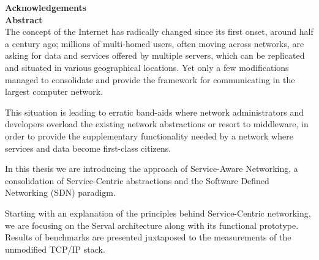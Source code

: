 \documentclass[12pt,a4paper,oneside]{article}
\begin{document}
\newcommand{\chapterpage}[2]{
	\newpage
	\pagestyle{empty}
	\phantomsection
	\addcontentsline{toc}{part}{#1}
	{\Huge \bf \noindent #2}
	\newpage
}

\newpage
\pagestyle{empty}
\mbox{}

\newpage
\setcounter{page}{2}


\newpage
\pagestyle{plain}
{\Large \bf \noindent Acknowledgements} \\[0.5cm]


\newpage
\thispagestyle{empty}
{\Large \bf \noindent Abstract} \\[0.13cm]

\noindent The concept of the Internet has radically changed since its first onset, around half a century ago; millions of multi-homed users, often moving across networks, are asking for data and services offered by multiple servers, which can be replicated and situated in various geographical locations.
Yet only a few modifications managed to consolidate and provide the framework for communicating in the largest computer network.

This situation is leading to erratic band-aids where network administrators and developers overload the existing network abstractions or resort to middleware, in order to provide the supplementary functionality needed by a network where services and data become first-class citizens.

In this thesis we are introducing the approach of Service-Aware Networking, a consolidation of Service-Centric abstractions and the Software Defined Networking (SDN) paradigm.

Starting with an explanation of the principles behind Service-Centric networking, we are focusing on the Serval architecture along with its functional prototype.
Results of benchmarks are presented juxtaposed to the measurements of the unmodified TCP/IP stack.
\end{document}
